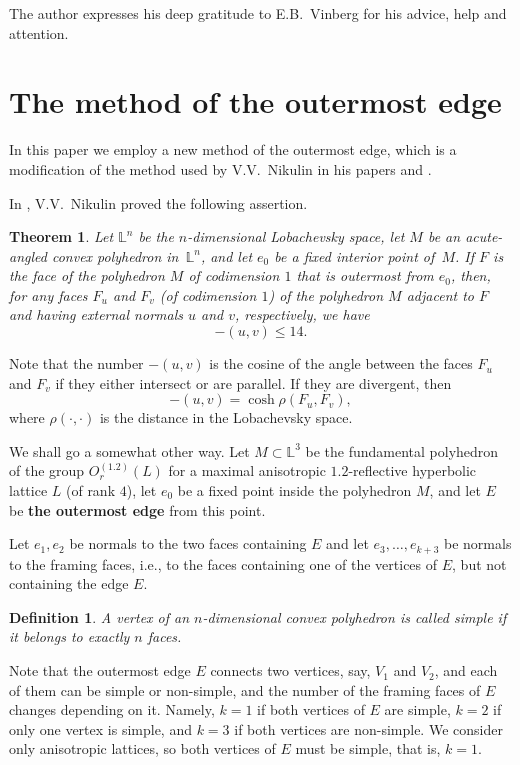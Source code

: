 \documentclass[14pt]{article}
\newtheorem{theorem}{\indent Theorem}[section]
\newtheorem{definition}{\indent Definition}[section]
\begin{document}
The author expresses his deep gratitude to
E.B.~Vinberg for his advice, help and attention.


\section{The method of the outermost edge}

In this paper we employ a new method of the outermost edge,
which
is a modification of the method used by V.V.~Nikulin in his papers
\cite{nikulin81klassargr} and \cite{nikulin2000hyp-root-sys}.

In  \cite{nikulin81klassargr}, V.V.~Nikulin proved the following assertion.

\begin{theorem}\label{nik-th}
Let $\mathbb{L}^n$ be  the $n$-dimensional Lobachevsky space, let $M$ be an
acute-angled convex polyhedron in~$\mathbb{L}^n$, and let $e_0$ be a
fixed interior point of~$M$. If $F$ is the face
of the polyhedron $M$ of codimension $1$ that is outermost
from $e_0$, then,
for any faces $F_u$ and $F_v$ (of codimension $1$) of the polyhedron
$M$ adjacent to $F$   and having external normals $u$ and $v$, respectively, we have
$$
- (u, v) \le 14.
$$
\end{theorem}

Note that the number $-(u, v)$ is the cosine of the angle between the
faces $F_u$ and $F_v$ if they either intersect or are parallel. If they are
divergent, then
$$
-(u,v) = \cosh \rho (F_u, F_v),
$$
where $\rho (\cdot, \cdot)$ is the distance in the Lobachevsky space.

We shall go a somewhat other way.
Let $M \subset \mathbb{L}^3 $ be the fundamental polyhedron of the group
$O^{(1.2)}_r (L)$ for a maximal anisotropic $1.2$-reflective hyperbolic lattice $L$
(of rank $4$), let $e_0$ be a fixed point inside the polyhedron $M$, and let $E$ be
{\bf the outermost edge} from this point.

Let $e_1, e_2$ be normals to the two faces containing  $E$
and let $e_3, \ldots, e_{k+3}$ be normals to the framing faces, i.e.,
to the faces containing one of
the vertices of $E$, but not containing the edge $E$.

\begin{definition}
A vertex of an $n$-dimensional convex polyhedron is called simple
if it belongs to exactly $n$ faces.
\end{definition}

Note that the outermost edge $E$
connects two vertices, say, $V_1$ and
$V_2$, and each of them can be simple or non-simple,
and the number of  the framing faces
of $E$ changes
depending on it. Namely, $k = 1$ if both vertices of  $E$ are simple,
$k = 2$ if only one vertex is simple,  and $k = 3$ if both vertices are non-simple.
We consider only anisotropic lattices, so both vertices of $E$ must be simple,
that is, $k = 1$.
\end{document}
